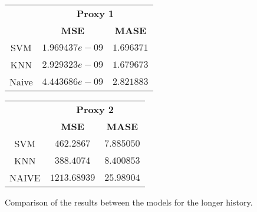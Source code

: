 \begin{figure}[!h]
\centering
\begin{minipage}{\textwidth}
\begin{minipage}{0.5\textwidth}
\begin{center}
\vskip10pt
   \begin{footnotesize}
   \begin{tabular}{|c|c|c|}
   \hline
   & \multicolumn{2}{|c|}{\textbf{Proxy 1}} \\ \cline{2-3}
   & \textbf{MSE} & \textbf{MASE}          \\ \hline
   SVM  & $1.969437e-09$ & $1.696371$         \\ 
   KNN & $2.929323e-09$ & $1.679673$ \\ 
   Naive & $4.443686e-09$ & $2.821883$     \\ 
   \hline
   \end{tabular}
   \end{footnotesize}
\end{center}
\end{minipage}
\begin{minipage}{0.5\textwidth}
\begin{center}
\vskip12pt
   \begin{footnotesize}
   \begin{tabular}{|c|c|c|}
   \hline
   & \multicolumn{2}{|c|}{\textbf{Proxy 2}} \\ \cline{2-3}
   & \textbf{MSE} & \textbf{MASE}          \\ \hline
   SVM  & $462.2867$      & $7.885050$         \\ 
   KNN & $388.4074$      & $8.400853$ \\ 
   NAIVE & $1213.68939$      & $25.98904$      \\ 
   \hline
   \end{tabular}
   \end{footnotesize}
\end{center}
\end{minipage}
\end{minipage}
\caption{Comparison of the results between the models for the longer history.}
\label{fig:compare10y}
\end{figure}